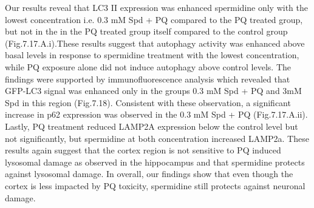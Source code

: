 Our results reveal that LC3 II expression was enhanced spermidine only with the lowest concentration i.e. 0.3 mM Spd + PQ compared to the PQ treated group, but not in the in the PQ treated group itself compared to the control group (Fig.7.17.A.i).These results suggest that autophagy activity was enhanced above basal levels in response to spermidine treatment with the lowest concentration, while PQ exposure alone did not induce autophagy above control levels. The findings were supported by immunofluorescence analysis which revealed that GFP-LC3 signal was enhanced only in the groups 0.3 mM Spd + PQ and 3mM Spd in this region (Fig.7.18). Consistent with these observation, a significant increase in p62 expression was observed in the 0.3 mM Spd + PQ (Fig.7.17.A.ii). Lastly, PQ treatment reduced LAMP2A expression below the control level but not significantly, but spermidine at both concentration increased LAMP2a. These results again suggest that the cortex region is not sensitive to PQ induced lysosomal damage as observed in the hippocampus and that spermidine protects against lysosomal damage. In overall, our findings show that even though the cortex is less impacted by PQ toxicity, spermidine still protects against neuronal damage. 












